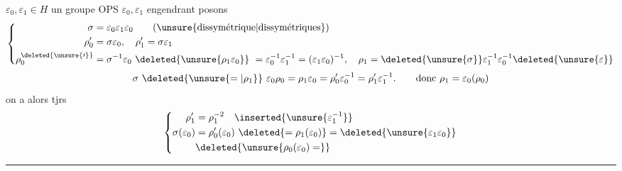 $\varepsilon_0,\varepsilon_1\in H$ un groupe OPS $\varepsilon_0,\varepsilon_1$ engendrant
posons
\[\left\{\begin{aligned}
\sigma&=\varepsilon_0\varepsilon_1\varepsilon_0\qquad\text{(\unsure{dissymétrique|dissymétriques})}\\
\rho'_0&=\sigma \varepsilon_0,\quad \rho'_1=\sigma \varepsilon_1\\
\rho_0^{\deleted{\unsure{\prime}}}&=\sigma^{-1}\varepsilon_0\ \deleted{\unsure{\rho_1\varepsilon_0}}\ =\varepsilon_0^{-1}\varepsilon_1^{-1}=(\varepsilon_1\varepsilon_0)^{-1},\quad \rho_1=\deleted{\unsure{\sigma}}\varepsilon_1^{-1}\varepsilon_0^{-1}\deleted{\unsure{\varepsilon}}
\end{aligned}\right.\]
\[\sigma\ \deleted{\unsure{=|\rho_1}}\ \varepsilon_0\rho_0=\rho_1\varepsilon_0=\rho'_0\varepsilon_0^{-1}=\rho'_1\varepsilon_1^{-1}.\qquad\text{donc }\rho_1=\varepsilon_0(\rho_0)\]
on a alors tjrs
\[\left\{\begin{aligned}
\rho'_1&=\rho_1^{-2}\quad\inserted{\unsure{\varepsilon_1^{-1}}}\\
\sigma(\varepsilon_0)&=\rho'_0(\varepsilon_0)\ \deleted{=\rho_1(\varepsilon_0)}=\deleted{\unsure{\varepsilon_1\varepsilon_0}}\\
&\deleted{\unsure{\rho_0(\varepsilon_0)=}}
\end{aligned}\right.\]
\noindent\rule{\linewidth}{.4pt}


